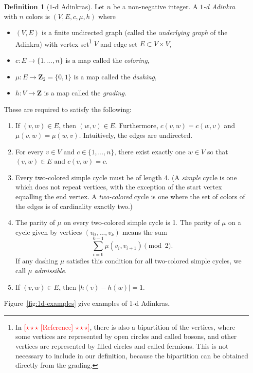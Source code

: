 \documentclass[12pt,twoside,singlespace]{article}
\numberwithin{equation}{section}
\theoremstyle{definition}
\newtheorem{definition}[equation]{Definition}
\newcommand{\ZZ}{\mathbf{Z}}
\newcommand{\com}[1]{\textcolor{red}{$[\star \star \star$ #1 $\star \star \star]$}}
\begin{document}
\begin{definition}[$1$-d Adinkras]
Let $n$ be a non-negative integer.  A \emph{$1$-d Adinkra} with $n$ colors is $(V,E,c,\mu,h)$ where
\begin{itemize}
\item $(V,E)$ is a finite undirected graph (called the \emph{underlying graph} of the Adinkra) with vertex set\footnote{In \com{[Reference]}, there is also a bipartition of the vertices, where some vertices are represented by open circles and called bosons, and other vertices are represented by filled circles and called fermions.  This is not necessary to include in our definition, because the bipartition can be obtained directly from the grading.}
 $V$ and edge set $E\subset V\times V$,
\item $c:E\to \{1,\ldots,n\}$ is a map called the \emph{coloring},
\item $\mu:E\to \ZZ_2=\{0,1\}$ is a map called the \emph{dashing},
\item $h:V\to\ZZ$ is a map called the \emph{grading}.
\end{itemize}

These are required to satisfy the following:
\begin{enumerate}
\item If $(v,w)\in E$, then $(w,v)\in E$.  Furthermore, $c(v,w)=c(w,v)$ and $\mu(v,w)=\mu(w,v)$.  Intuitively, the edges are undirected.
\item For every $v\in V$ and $c\in \{1,\ldots,n\}$, there exist exactly one $w\in V$ so that $(v,w)\in E$ and $c(v,w)=c$.
\item Every two-colored simple cycle must be of length 4.  (A \emph{simple} cycle is one which does not repeat vertices, with the exception of the start vertex equalling the end vertex.  A \emph{two-colored} cycle is one where the set of colors of the edges is of cardinality exactly two.)
\item The parity of $\mu$ on every two-colored simple cycle is 1.  The parity of $\mu$ on a cycle given by vertices $(v_0,\ldots,v_k)$ means the sum
\[\sum_{i=0}^{k-1}\mu(v_i,v_{i+1})\pmod{2}.\]
If any dashing $\mu$ satisfies this condition for all two-colored simple cycles, we call $\mu$ \emph{admissible}.
\item If $(v,w)\in E$, then $|h(v)-h(w)|=1$.
\end{enumerate}

Figure~\ref{fig:1d-examples} give examples of 1-d Adinkras.
\end{definition}
\end{document}
